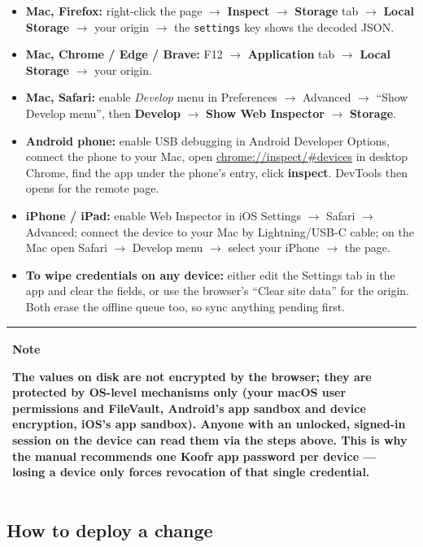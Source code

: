 \documentclass[11pt,a4paper]{article}
\newcommand{\callout}[3]{%
  \begin{center}%
  \begin{tabularx}{\linewidth}{|>{\columncolor{#1}}X|}%
  \hline
  \textbf{#2}\par\smallskip #3\\[2pt]
  \hline
  \end{tabularx}%
  \end{center}%
}
\newcommand{\notebox}[1]{\callout{notebg}{Note}{#1}}
\begin{document}
\begin{itemize}[leftmargin=*,nosep]
  \item \textbf{Mac, Firefox:} right-click the page $\rightarrow$ \textbf{Inspect} $\rightarrow$ \textbf{Storage} tab $\rightarrow$ \textbf{Local Storage} $\rightarrow$ your origin $\rightarrow$ the \texttt{settings} key shows the decoded JSON.
  \item \textbf{Mac, Chrome / Edge / Brave:} F12 $\rightarrow$ \textbf{Application} tab $\rightarrow$ \textbf{Local Storage} $\rightarrow$ your origin.
  \item \textbf{Mac, Safari:} enable \emph{Develop} menu in Preferences $\rightarrow$ Advanced $\rightarrow$ ``Show Develop menu'', then \textbf{Develop} $\rightarrow$ \textbf{Show Web Inspector} $\rightarrow$ \textbf{Storage}.
  \item \textbf{Android phone:} enable USB debugging in Android Developer Options, connect the phone to your Mac, open \url{chrome://inspect/#devices} in desktop Chrome, find the app under the phone's entry, click \textbf{inspect}. DevTools then opens for the remote page.
  \item \textbf{iPhone / iPad:} enable Web Inspector in iOS Settings $\rightarrow$ Safari $\rightarrow$ Advanced; connect the device to your Mac by Lightning/USB-C cable; on the Mac open Safari $\rightarrow$ Develop menu $\rightarrow$ select your iPhone $\rightarrow$ the page.
  \item \textbf{To wipe credentials on any device:} either edit the Settings tab in the app and clear the fields, or use the browser's ``Clear site data'' for the origin. Both erase the offline queue too, so sync anything pending first.
\end{itemize}

\notebox{The values on disk are not encrypted by the browser; they are protected by OS-level mechanisms only (your macOS user permissions and FileVault, Android's app sandbox and device encryption, iOS's app sandbox). Anyone with an unlocked, signed-in session on the device can read them via the steps above. This is why the manual recommends one Koofr app password per device --- losing a device only forces revocation of that single credential.}

\subsection{How to deploy a change}
\end{document}
